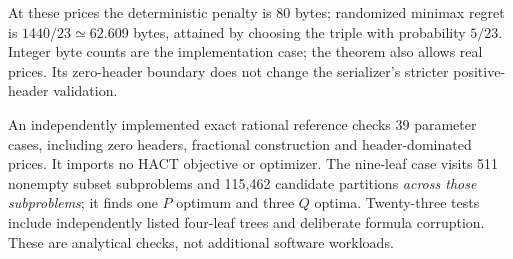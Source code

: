 

At these prices the deterministic penalty is 80 bytes; randomized minimax
regret is $1440/23\simeq62.609$ bytes, attained by choosing the triple with
probability $5/23$. Integer byte counts are the implementation case; the
theorem also allows real prices. Its zero-header boundary does not change
the serializer's stricter positive-header validation.

An independently implemented exact rational reference checks 39 parameter
cases, including zero headers, fractional construction and header-dominated
prices. It imports no HACT objective or optimizer. The nine-leaf case visits
511 nonempty subset subproblems and 115,462 candidate partitions \emph{across
those subproblems}; it finds one $P$ optimum and three $Q$ optima. Twenty-three
tests include independently listed four-leaf trees and deliberate formula
corruption. These are analytical checks, not additional software workloads.
